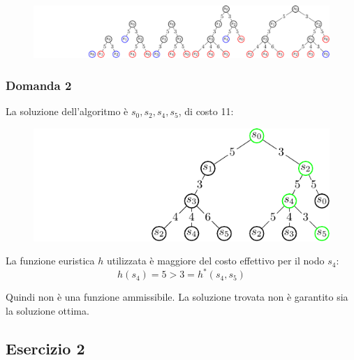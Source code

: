 \documentclass{article}
\numberwithin{equation}{section}
\begin{document}
\begin{figure}[H]%
    \centering%
    \includegraphics[trim={3.9cm 0 0 0}, scale=0.95]{albero_esercitazione_1.pdf}%
\end{figure}

\subsubsection*{Domanda 2}

La soluzione dell'algoritmo è $s_0,s_2,s_4,s_5$, di costo 11:
\begin{figure}[H]%
    \centering%
    \includegraphics[trim={4cm 0 0 0}]{soluzione_esercitazione_1.pdf}%
\end{figure}

La funzione euristica $h$ utilizzata è maggiore del costo effettivo per il nodo $s_4$: 
\begin{equation}
    h(s_4)=5>3=h^*(s_4,s_5)
\end{equation}

Quindi non è una funzione ammissibile. La soluzione trovata 
non è garantito sia la soluzione ottima. 

\subsection*{Esercizio 2}
\end{document}
